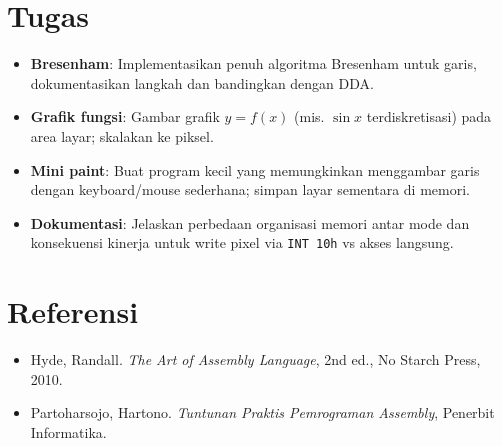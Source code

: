 \section{Tugas}
\begin{itemize}
  \item \textbf{Bresenham}: Implementasikan penuh algoritma Bresenham untuk garis, dokumentasikan langkah dan bandingkan dengan DDA.
  \item \textbf{Grafik fungsi}: Gambar grafik \(y=f(x)\) (mis. \(\sin x\) terdiskretisasi) pada area layar; skalakan ke piksel.
  \item \textbf{Mini paint}: Buat program kecil yang memungkinkan menggambar garis dengan keyboard/mouse sederhana; simpan layar sementara di memori.
  \item \textbf{Dokumentasi}: Jelaskan perbedaan organisasi memori antar mode dan konsekuensi kinerja untuk write pixel via \texttt{INT 10h} vs akses langsung.
\end{itemize}

\section{Referensi}
\begin{itemize}
  \item Hyde, Randall. \textit{The Art of Assembly Language}, 2nd ed., No Starch Press, 2010.
  \item Partoharsojo, Hartono. \textit{Tuntunan Praktis Pemrograman Assembly}, Penerbit Informatika.
\end{itemize}
